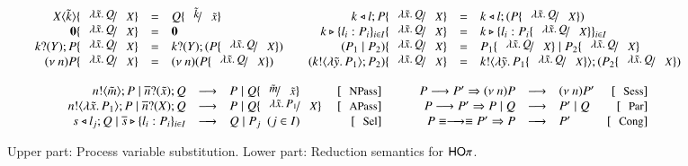 \begin{figure}[t!]
\[
	\begin{array}{c}
		\begin{array}{rclcrcl}
			\appl{X}{\tilde{k}} \subst{\abs{\tilde{x}}{Q}}{\X} & = & Q \subst{\tilde{k}}{\tilde{x}}
			& &
			\bsel{k}{l} P \subst{\abs{\tilde{x}}{Q}}{\X} & = & \bsel{k}{l} (P \subst{\abs{\tilde{x}}{Q}}{\X})
			\\

			\inact \subst{\abs{\tilde{x}}{Q}}{\X} & = & \inact
			& &
			\bbra{k}{l_i : P_i}_{i \in I} \subst{\abs{\tilde{x}}{Q}}{\X} & = & \bbra{k}{l_i : P_i \subst{\abs{\tilde{x}}{Q}}{\X}}_{i \in I} 
			\\

			\binp{k}{Y} P \subst{\abs{\tilde{x}}{Q}}{X} & = & \binp{k}{Y} (P \subst{\abs{\tilde{x}}{Q}}{X})
			& &
			(P_1 \Par P_2) \subst{\abs{\tilde{x}}{Q}}{X} & = & P_1 \subst{\abs{\tilde{x}}{Q}}{X} \Par P_2 \subst{\abs{\tilde{x}}{Q}}{X}
			\\

			\news{n} P \subst{\abs{\tilde{x}}{Q}}{\X} & = & \news{n} (P \subst{\abs{\tilde{x}}{Q}}{X})
			& &
			(\bout{k}{\abs{\tilde{y}}{P_1}} P_2) \subst{\abs{\tilde{x}}{Q}}{X} & = & \bout{k}{\abs{\tilde{y}}{P_1 \subst{\abs{\tilde{x}}{Q}}{X}}} (P_2 \subst{\abs{\tilde{x}}{Q}}{X})
		\end{array}

		\vspace{4mm}\\

		\begin{array}{rclrcrclr}
			\bout{n}{\tilde{m}} P \Par \binp{\dual{n}}{\tilde{x}} Q & \red & P \Par Q \subst{\tilde{m}}{\tilde{x}} & \orule{NPass}
			& \quad &
			P \red P' \Rightarrow \news{n} P & \red & \news{n} P'  & \orule{Sess}
			\\

			\bout{n}{\abs{\tilde{x}}{P_1}} P \Par \binp{\dual{n}}{\X} Q & \red & P \Par Q \subst{\abs{\tilde{x}}{P_1}}{\X}\ & \orule{APass}
			& &
			P \red P' \Rightarrow   P \Par Q & \red &  P' \Par Q  & \orule{Par}
			\\

			\bsel{s}{l_j} Q \Par \bbra{\dual{s}}{l_i : P_i}_{i \in I} & \red & Q \Par P_j ~~(j \in I)~~  & \orule{Sel}
			& &
			P \scong \red \scong P' \Rightarrow P & \red & P' & \orule{Cong}\\
		\end{array}
	\end{array}
\]
	\caption{Upper part: Process variable substitution. Lower part: Reduction semantics for $\mathsf{HO}\pi$. \label{fig:reduction}}
\end{figure}
